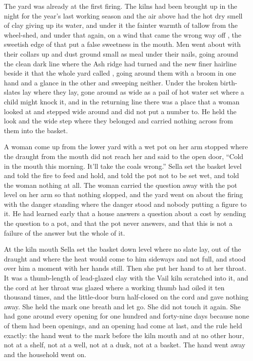 The yard was already at the first firing. The kilns had been brought up in the night for the year's last working season and the air above  had the hot dry smell of clay giving up its water, and under it the fainter warmth of tallow from the wheel-shed, and under that again, on a wind that came the wrong way off , the sweetish edge of  that put a false sweetness in the mouth. Men went about with their collars up and dust ground small as meal under their nails, going around the clean dark line where the Ash ridge had turned and the new finer hairline beside it that the whole yard called , going around them with a broom in one hand and a glance in the other and sweeping neither. Under  the broken birth-slates lay where they lay, gone around as wide as a pail of hot water set where a child might knock it, and in the returning line there was a place that a woman looked at and stepped wide around and did not put a number to. He held the look and the wide step where they belonged and carried nothing across from them into the basket.

A woman come up from the lower yard with a wet pot on her arm stopped where the draught from the mouth did not reach her and said to the open door, “Cold in the mouth this morning. It'll take the coals wrong.” Sella set the basket level and told the fire to feed and hold, and told the pot not to be set wet, and told the woman nothing at all. The woman carried the question away with the pot level on her arm so that nothing slopped, and the yard went on about the firing with the danger standing where the danger stood and nobody putting a figure to it. He had learned early that a house answers a question about a cost by sending the question to a pot, and that the pot never answers, and that this is not a failure of the answer but the whole of it.

At the kiln mouth Sella set the basket down level where no slate lay, out of the draught and where the heat would come to him sideways and not full, and stood over him a moment with her hands still. Then she put her hand to  at her throat. It was a thumb-length of lead-glazed clay with the Vail kiln scratched into it, and the cord at her throat was glazed where a working thumb had oiled it ten thousand times, and the little-door burn half-closed on the cord and gave nothing away. She held the mark one breath and let go. She did not touch it again. She had gone around every opening for one hundred and forty-nine days because none of them had been openings, and an opening had come at last, and the rule held exactly: the hand went to the mark before the kiln mouth and at no other hour, not at a shelf, not at a well, not at a dusk, not at a basket. The hand went away and the household went on.

